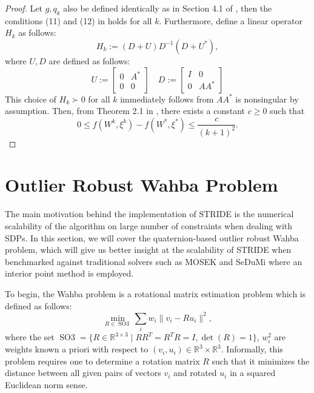 \documentclass[12pt]{l4dc2021}
\DeclareMathOperator{\so}{SO3}
\begin{document}
    \begin{proof}
        Let $g,q_k$ also be defined identically as in Section 4.1 of \cite{yang2021inexact}, then the conditions (11) and (12) in \cite{iapgm} holds for all $k$. Furthermore, define a linear operator $H_k$ as follows:
        \begin{equation}
            H_k := (D+U)D^{-1}(D+U^*),
        \end{equation}
        where $U,D$ are defined as follows:
        \begin{equation}
            U := \begin{bmatrix}
                0 & A^* \\ 0 & 0
            \end{bmatrix} \quad D := \begin{bmatrix}
                I & 0 \\ 0 & AA^*
            \end{bmatrix}
        \end{equation}
        This choice of $H_k \succ 0$ for all $k$ immediately follows from $AA^*$ is nonsingular by assumption. Then, from Theorem 2.1 in \citet{iapgm}, there exists a constant $c \ge 0$ such that 
        \begin{equation}
            0 \le f(W^k, \xi^k) - f(W^*, \xi^*) \le \frac{c}{(k+1)^2}.
        \end{equation}
    \end{proof}

\section{Outlier Robust Wahba Problem}\label{sec:wahbaSection}
     The main motivation behind the implementation of STRIDE is the numerical scalability of the algorithm on large number of constraints when dealing with SDPs. In this section, we will cover the quaternion-based outlier robust Wahba problem, which will give us better insight at the scalability of STRIDE when benchmarked against traditional solvers such as MOSEK and SeDuMi where an interior point method is employed.

     To begin, the Wahba problem is a rotational matrix estimation problem which is defined as follows:
     \begin{equation}
         \min_{R \in \so} \sum_i w_i \|v_i - Ru_i\|^2, \label{eq:stdWahba}
     \end{equation}
     where the set $\so = \{R \in \mathbb{R}^{3\times 3} \mid RR^T = R^TR = I, \det(R) = 1 \}$, $w_i^2$ are weights known a priori with respect to $(v_i,u_i) \in \mathbb{R}^3 \times \mathbb{R}^3$. Informally, this problem requires one to determine a rotation matrix $R$ such that it minimizes the distance between all given pairs of vectors $v_i$ and rotated $u_i$ in a squared Euclidean norm sense. 
\end{document}
